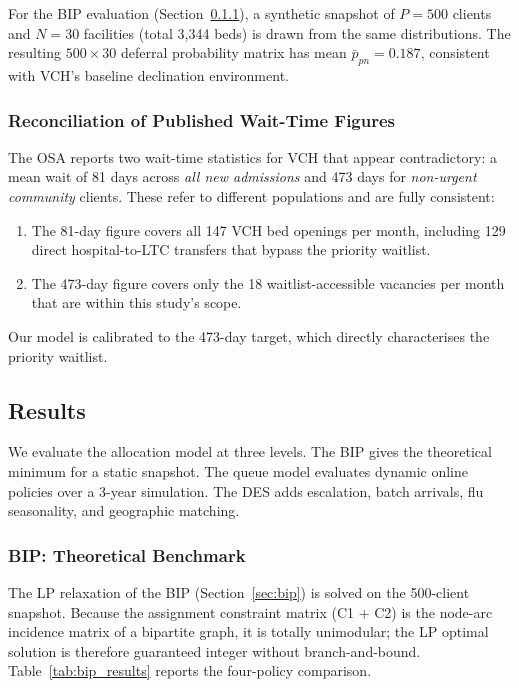 For the BIP evaluation (Section~\ref{sec:bip_results}), a synthetic snapshot of
$P = 500$ clients and $N = 30$ facilities (total 3{,}344 beds) is drawn from the same
distributions.  The resulting $500 \times 30$ deferral probability matrix has mean
$\bar{p}_{pn} = 0.187$, consistent with VCH's baseline declination environment.

\subsubsection*{Reconciliation of Published Wait-Time Figures}

The OSA reports two wait-time statistics for VCH that appear contradictory: a mean wait
of 81 days across \emph{all new admissions} and 473 days for \emph{non-urgent community}
clients.  These refer to different populations and are fully consistent:

\begin{enumerate}[noitemsep]
  \item The 81-day figure covers all 147 VCH bed openings per month, including 129 direct
        hospital-to-LTC transfers that bypass the priority waitlist.
  \item The 473-day figure covers only the 18 waitlist-accessible vacancies per month
        that are within this study's scope.
\end{enumerate}

\noindent
Our model is calibrated to the 473-day target, which directly characterises the
priority waitlist.

\subsection{Results}
\label{sec:vchr}

We evaluate the allocation model at three levels.  The BIP gives the theoretical
minimum for a static snapshot.  The queue model evaluates dynamic online policies over
a 3-year simulation.  The DES adds escalation, batch arrivals, flu seasonality, and
geographic matching.

\subsubsection{BIP: Theoretical Benchmark}
\label{sec:bip_results}

The LP relaxation of the BIP (Section~\ref{sec:bip}) is solved on the 500-client
snapshot.  Because the assignment constraint matrix (C1 + C2) is the node-arc
incidence matrix of a bipartite graph, it is totally unimodular; the LP optimal
solution is therefore guaranteed integer without branch-and-bound.
Table~\ref{tab:bip_results} reports the four-policy comparison.

